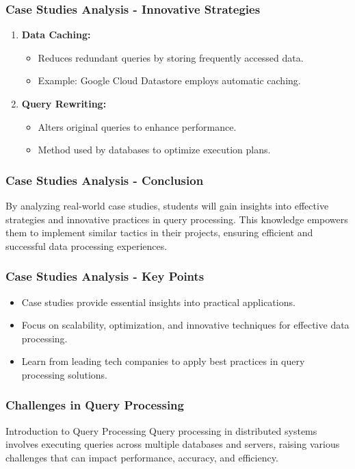 \documentclass[aspectratio=169]{beamer}
\begin{document}
\begin{frame}[fragile]
    \frametitle{Case Studies Analysis - Innovative Strategies}
    \begin{enumerate}
        \item \textbf{Data Caching:}
        \begin{itemize}
            \item Reduces redundant queries by storing frequently accessed data.
            \item Example: Google Cloud Datastore employs automatic caching.
        \end{itemize}

        \item \textbf{Query Rewriting:}
        \begin{itemize}
            \item Alters original queries to enhance performance.
            \item Method used by databases to optimize execution plans.
        \end{itemize}
    \end{enumerate}
\end{frame}

\begin{frame}[fragile]
    \frametitle{Case Studies Analysis - Conclusion}
    By analyzing real-world case studies, students will gain insights into effective strategies and innovative practices in query processing. This knowledge empowers them to implement similar tactics in their projects, ensuring efficient and successful data processing experiences.
\end{frame}

\begin{frame}[fragile]
    \frametitle{Case Studies Analysis - Key Points}
    \begin{itemize}
        \item Case studies provide essential insights into practical applications.
        \item Focus on scalability, optimization, and innovative techniques for effective data processing.
        \item Learn from leading tech companies to apply best practices in query processing solutions.
    \end{itemize}
\end{frame}

\begin{frame}[fragile]
    \frametitle{Challenges in Query Processing}
    
    \begin{block}{Introduction to Query Processing}
        Query processing in distributed systems involves executing queries across multiple databases and servers, raising various challenges that can impact performance, accuracy, and efficiency. 
    \end{block}
\end{frame}
\end{document}
